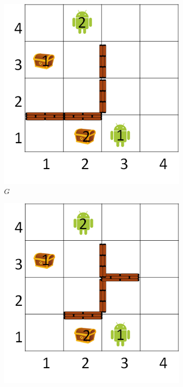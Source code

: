\documentclass[letterpaper]{article} %
\def\
UrlFont{\rm}  %
\theoremstyle{definition}
\begin{document}
\begin{figure}[t]
        \centering
    \begin{subfigure}[b]{0.45\columnwidth}\centering
      \includegraphics[scale=0.3]{Figures/G.png}
      \caption{$G$}
      \label{fig:G}
    \end{subfigure}
    \begin{subfigure}[b]{0.45\columnwidth}\centering
      \includegraphics[scale=.3]{Figures/Gs0.png}

\end{subfigure}
\end{figure}
\end{document}
